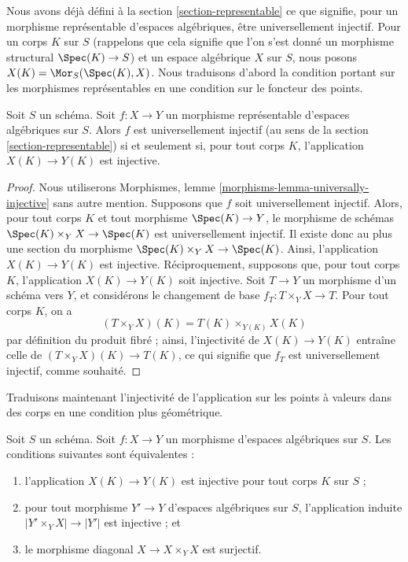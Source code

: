 \noindent
Nous avons déjà défini à la section \ref{section-representable}
ce que signifie, pour un morphisme représentable d'espaces algébriques,
être universellement injectif. Pour un corps $K$ sur $S$ (rappelons que cela
signifie que l'on s'est donné un morphisme structural $\Spec(K) \to S$) et un
espace algébrique $X$ sur $S$, nous posons
$X(K) = \Mor_S(\Spec(K), X)$. Nous traduisons d'abord la
condition portant sur les morphismes représentables en une condition sur le foncteur
des points.

\begin{lemma}
\label{lemma-universally-injective-representable}
Soit $S$ un schéma. Soit $f : X \to Y$ un morphisme représentable
d'espaces algébriques sur $S$. Alors $f$ est universellement injectif
(au sens de la section \ref{section-representable})
si et seulement si, pour tout corps $K$, l'application $X(K) \to Y(K)$ est injective.
\end{lemma}

\begin{proof}
Nous utiliserons
Morphismes, lemme \ref{morphisms-lemma-universally-injective}
sans autre mention.
Supposons que $f$ soit universellement injectif. Alors, pour tout corps $K$ et tout
morphisme $\Spec(K) \to Y$, le morphisme de schémas
$\Spec(K) \times_Y X \to \Spec(K)$ est universellement injectif.
Il existe donc au plus une section du morphisme
$\Spec(K) \times_Y X \to \Spec(K)$. Ainsi, l'application
$X(K) \to Y(K)$ est injective. Réciproquement, supposons que, pour tout corps $K$,
l'application $X(K) \to Y(K)$ soit injective. Soit $T \to Y$ un morphisme d'un
schéma vers $Y$, et considérons le changement de base $f_T : T \times_Y X \to T$.
Pour tout corps $K$, on a
$$
(T \times_Y X)(K) = T(K) \times_{Y(K)} X(K)
$$
par définition du produit fibré ; ainsi, l'injectivité de
$X(K) \to Y(K)$ entraîne celle de
$(T \times_Y X)(K) \to T(K)$, ce qui signifie que $f_T$ est universellement injectif,
comme souhaité.
\end{proof}

\noindent
Traduisons maintenant l'injectivité de l'application sur les points à valeurs
dans des corps en une condition plus géométrique.

\begin{lemma}
\label{lemma-universally-injective}
Soit $S$ un schéma.
Soit $f : X \to Y$ un morphisme d'espaces algébriques sur $S$.
Les conditions suivantes sont équivalentes :
\begin{enumerate}
\item l'application $X(K) \to Y(K)$ est injective pour tout corps $K$ sur $S$ ;
\item pour tout morphisme $Y' \to Y$ d'espaces algébriques sur $S$,
l'application induite $|Y' \times_Y X| \to |Y'|$ est injective ; et
\item le morphisme diagonal $X \to X \times_Y X$ est surjectif.
\end{enumerate}
\end{lemma}

